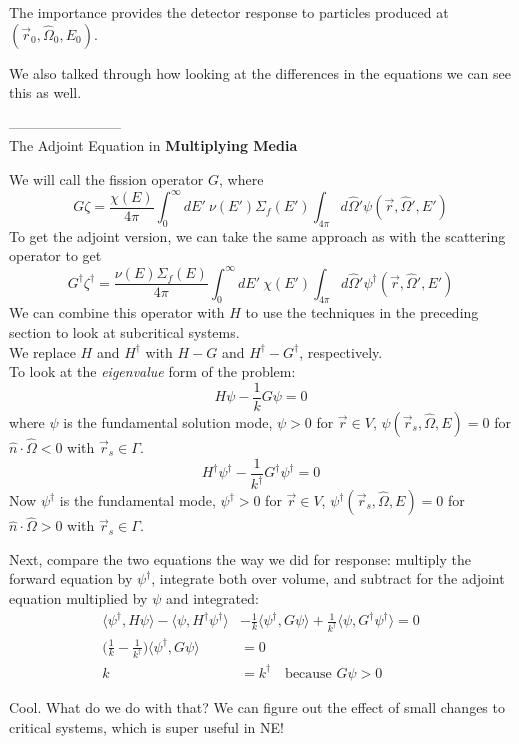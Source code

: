 \documentclass[12pt]{article}
\newcommand{\rvec}{\ensuremath{\vec{r}}}
\newcommand{\vOmega}{\ensuremath{\hat{\Omega}}}
\begin{document}
The importance provides the detector response to particles produced at $(\rvec_0, \vOmega_0, E_0)$.

We also talked through how looking at the differences in the equations we can see this as well. 

------------------------\\
The Adjoint Equation in \textbf{Multiplying Media}

We will call the fission operator $G$, where
\[
G \zeta = \frac{\chi(E)}{4\pi}\int_0^{\infty} dE' \: \nu(E') \Sigma_f(E') \int_{4\pi} d\vOmega' \psi(\rvec, \vOmega', E')
\]
To get the adjoint version, we can take the same approach as with the scattering operator to get
\[
G^{\dagger} \zeta^{\dagger} = \frac{\nu(E) \Sigma_f(E)}{4\pi}\int_0^{\infty} dE' \: \chi(E') \int_{4\pi} d\vOmega' \psi^{\dagger}(\rvec, \vOmega', E')
\]
We can combine this operator with $H$ to use the techniques in the preceding section to look at subcritical systems.\\
We replace $H$ and $H^{\dagger}$ with $H-G$ and $H^{\dagger}-G^{\dagger}$, respectively.\\

To look at the \textit{eigenvalue} form of the problem:
\[
H\psi - \frac{1}{k}G\psi = 0
\]
where $\psi$ is the fundamental solution mode, $\psi > 0$ for $\rvec \in V$, $\psi(\vec{r}_s, \vOmega, E) = 0$ for $\hat{n} \cdot \vOmega < 0$ with $\vec{r}_s \in \Gamma$.  
\[
H^{\dagger}\psi^{\dagger} - \frac{1}{k^{\dagger}}G^{\dagger}\psi^{\dagger} = 0
\]
Now $\psi^{\dagger}$ is the fundamental mode, $\psi^{\dagger} > 0$ for $\rvec \in V$, $\psi^{\dagger}(\vec{r}_s, \vOmega, E) = 0$ for $\hat{n} \cdot \vOmega > 0$ with $\vec{r}_s \in \Gamma$.  

Next, compare the two equations the way we did for response: multiply the forward equation by $\psi^{\dagger}$, integrate both over volume, and subtract for the adjoint equation multiplied by $\psi$ and integrated:
\begin{align*}
\langle\psi^{\dagger}, H\psi\rangle - \langle\psi, H^{\dagger} \psi^{\dagger}\rangle &- \frac{1}{k}\langle\psi^{\dagger}, G\psi\rangle + \frac{1}{k^{\dagger}}\langle\psi, G^{\dagger}\psi^{\dagger}\rangle = 0\\
\bigl(\frac{1}{k} - \frac{1}{k^{\dagger}} \bigr)\langle\psi^{\dagger}, G\psi\rangle  &= 0 \\
k &= k^{\dagger} \quad \text{because }G\psi > 0
\end{align*}

Cool. What do we do with that? We can figure out the effect of small changes to critical systems, which is super useful in NE!
\end{document}

